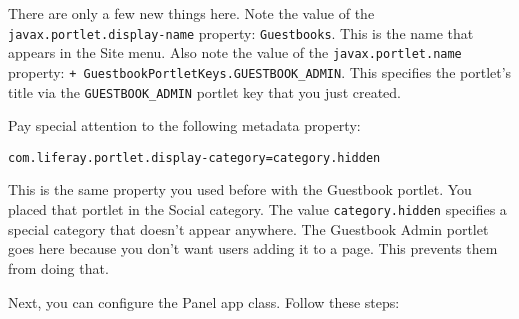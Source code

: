 There are only a few new things here. Note the value of the
\texttt{javax.portlet.display-name} property: \texttt{Guestbooks}. This
is the name that appears in the Site menu. Also note the value of the
\texttt{javax.portlet.name} property:
\texttt{+\ GuestbookPortletKeys.GUESTBOOK\_ADMIN}. This specifies the
portlet's title via the \texttt{GUESTBOOK\_ADMIN} portlet key that you
just created.

Pay special attention to the following metadata property:

\begin{verbatim}
com.liferay.portlet.display-category=category.hidden
\end{verbatim}

This is the same property you used before with the Guestbook portlet.
You placed that portlet in the Social category. The value
\texttt{category.hidden} specifies a special category that doesn't
appear anywhere. The Guestbook Admin portlet goes here because you don't
want users adding it to a page. This prevents them from doing that.

Next, you can configure the Panel app class. Follow these steps:

